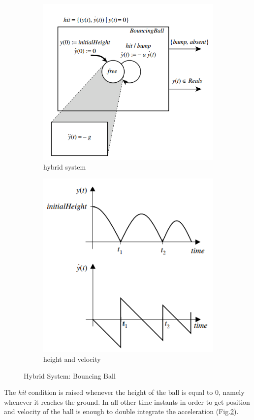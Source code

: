 \begin{figure}[!ht]
	\centering 
    \begin{subfigure}[b]{0.45\textwidth}
    \includegraphics[width=\textwidth]{Figs/bounball.png} 
    	\caption{hybrid system} 
        \label{fig:bounballhs}
    \end{subfigure}
    \begin{subfigure}[b]{0.45\textwidth}
    	\includegraphics[width=\textwidth]{Figs/bounballout.png} 
        \caption{height and velocity} 
    	\label{fig:bounballout}
    \end{subfigure}    
     \caption{Hybrid System: Bouncing Ball} 
     \label{fig:bounball} 
\end{figure}

The \textit{hit} condition is raised whenever the height of the ball is equal to 0, namely whenever it reaches the ground. In all other time instants in order to get position and velocity of the ball is enough to double integrate the acceleration (Fig.\ref{fig:bounballout}).
